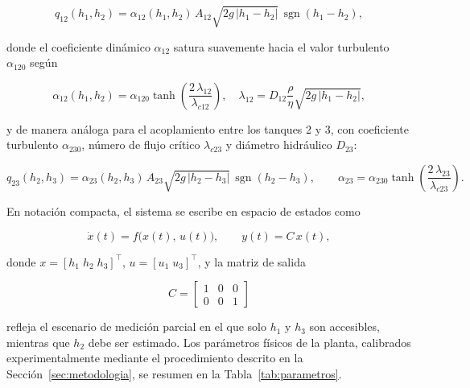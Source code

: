 \documentclass[12pt,letterpaper]{article}
\begin{document}
\begin{equation}
q_{12}(h_1,h_2) = \alpha_{12}(h_1,h_2)\,A_{12}\sqrt{2g\,|h_1-h_2|}\,\operatorname{sgn}(h_1-h_2),
\end{equation}

donde el coeficiente dinámico $\alpha_{12}$ satura suavemente hacia el valor
turbulento $\alpha_{120}$ según

\begin{equation}
\alpha_{12}(h_1,h_2) = \alpha_{120}\tanh\!\left(\frac{2\,\lambda_{12}}{\lambda_{c12}}\right), \quad
\lambda_{12} = D_{12}\frac{\rho}{\eta}\sqrt{2g\,|h_1-h_2|},
\end{equation}

y de manera análoga para el acoplamiento entre los tanques 2 y 3, con coeficiente
turbulento $\alpha_{230}$, número de flujo crítico $\lambda_{c23}$ y diámetro
hidráulico $D_{23}$:

\begin{equation}
q_{23}(h_2,h_3) = \alpha_{23}(h_2,h_3)\,A_{23}\sqrt{2g\,|h_2-h_3|}\,\operatorname{sgn}(h_2-h_3),
\qquad
\alpha_{23} = \alpha_{230}\tanh\!\left(\frac{2\,\lambda_{23}}{\lambda_{c23}}\right).
\end{equation}

En notación compacta, el sistema se escribe en espacio de estados como

\begin{equation}
\dot{x}(t) = f\bigl(x(t),\,u(t)\bigr), \qquad y(t) = C\,x(t),
\label{eq:ss}
\end{equation}

donde $x = [h_1\;h_2\;h_3]^\top$, $u = [u_1\;u_3]^\top$, y la matriz de salida

\begin{equation}
C = \begin{bmatrix}1&0&0\\0&0&1\end{bmatrix}
\end{equation}

refleja el escenario de medición parcial en el que solo $h_1$ y $h_3$ son accesibles,
mientras que $h_2$ debe ser estimado. Los parámetros físicos de la planta, calibrados
experimentalmente mediante el procedimiento descrito en la
Sección~\ref{sec:metodologia}, se resumen en la Tabla~\ref{tab:parametros}.
\end{document}
